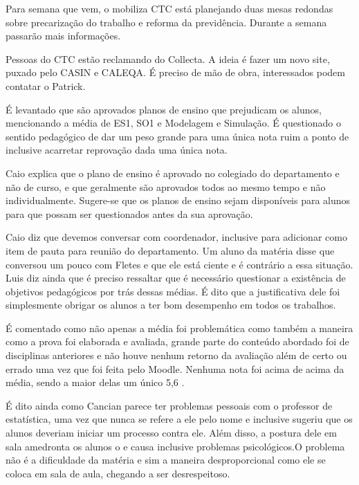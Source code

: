 \documentclass{ata-calico}
\begin{document}
\maketitle

Para semana que vem, o mobiliza CTC está planejando duas mesas redondas sobre precarização do trabalho e reforma da previdência. Durante a semana passarão mais informações.

Pessoas do CTC estão reclamando do Collecta. A ideia é fazer um novo site, puxado pelo CASIN e CALEQA. É preciso de mão de obra, interessados podem contatar o Patrick.

É levantado que são aprovados planos de ensino que prejudicam os alunos, mencionando a média de ES1, SO1 e Modelagem e Simulação. É questionado o sentido pedagógico de dar um peso grande para uma única nota ruim a ponto de inclusive acarretar reprovação dada uma única nota.

Caio explica que o plano de ensino é aprovado no colegiado do departamento e não de curso, e que geralmente são aprovados todos ao mesmo tempo e não individualmente. Sugere-se que os planos de ensino sejam disponíveis para alunos para que possam ser questionados antes da sua aprovação.

Caio diz que devemos conversar com coordenador, inclusive para adicionar como item de pauta para reunião do departamento. Um aluno da matéria disse que conversou um pouco com Fletes e que ele está ciente e é contrário a essa situação. Luis diz ainda que é preciso ressaltar que é necessário questionar a existência de objetivos pedagógicos por trás dessas médias. É dito que a justificativa dele foi simplesmente obrigar os alunos a ter bom desempenho em todos os trabalhos.

É comentado como não apenas a média foi problemática como também a maneira como a prova foi elaborada e avaliada, grande parte do conteúdo abordado foi de disciplinas anteriores e não houve nenhum retorno da avaliação além de certo ou errado uma vez que foi feita pelo Moodle. Nenhuma nota foi acima de acima da média, sendo a maior delas um único 5,6 .

É dito ainda como Cancian parece ter problemas pessoais com o professor de estatística, uma vez que nunca se refere a ele pelo nome e inclusive sugeriu que os alunos deveriam iniciar um processo contra ele. Além disso, a postura dele em sala amedronta os alunos o e causa inclusive problemas psicológicos.O problema não é a dificuldade da matéria e sim a maneira desproporcional como ele se coloca em sala de aula, chegando a ser desrespeitoso.
\end{document}
